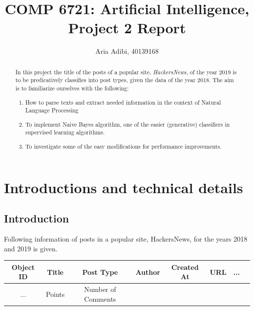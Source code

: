 \documentclass[11pt]{article}
\title{COMP 6721: Artificial Intelligence,\\Project 2 Report}
\author{ Aria Adibi, 40139168}
\date{}
\begin{document}
	\maketitle
	
	
	\begin{abstract}
		In this project the title of the posts of a popular site, \emph{HackersNews}, of the year 2019 is to be predicatively classifies into post types, given the data of the year 2018. The aim is to familiarize ourselves with the following:
		\begin{enumerate}
			\item
			How to parse texts and extract needed information in the context of Natural Language Processing
			\item
			To implement Naive Bayes algorithm, one of the easier (generative) classifiers in supervised learning algorithms.
			\item
			To investigate some of the easy modifications for performance improvements.
			
		\end{enumerate} 
	\end{abstract}
	
	\pagebreak %
	
	\tableofcontents
	\listoftables
	
	\newpage
	
	\section{ Introductions and technical details }
		\subsection{ Introduction }
			Following information of posts in a popular site, HackersNews, for the years 2018 and 2019 is given.
			
			\begin{centering}
				\begin{tabular}{ | c | c | c | c | c | c | c | c |}
					\hline
					Object ID & Title & Post Type & Author & Created At & URL & ... \\
					\hline
					... & Points & Number of Comments \\
					\cline{1-3}
				\end{tabular}
			\end{centering}
			
\end{document}
